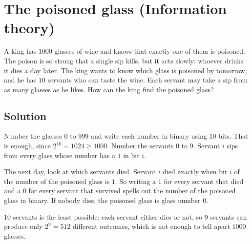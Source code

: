 \section {The poisoned glass (Information theory)}

A king has $1000$ glasses of wine and knows that exactly one of them is poisoned.
The poison is so strong that a single sip kills, but it acts slowly: whoever drinks it dies a day later.
The king wants to know which glass is poisoned by tomorrow, and he has $10$ servants who can taste the wine.
Each servant may take a sip from as many glasses as he likes. How can the king find the poisoned glass?

\subsection{Solution}

Number the glasses $0$ to $999$ and write each number in binary using $10$ bits. That is enough, since $2^{10} = 1024 \ge 1000$.
Number the servants $0$ to $9$. Servant $i$ sips from every glass whose number has a $1$ in bit $i$.

The next day, look at which servants died. Servant $i$ died exactly when bit $i$ of the number of the poisoned glass is $1$.
So writing a $1$ for every servant that died and a $0$ for every servant that survived spells out the number of the poisoned glass in binary.
If nobody dies, the poisoned glass is glass number $0$.

$10$ servants is the least possible: each servant either dies or not, so $9$ servants can produce only $2^9 = 512$ different outcomes,
which is not enough to tell apart $1000$ glasses.
